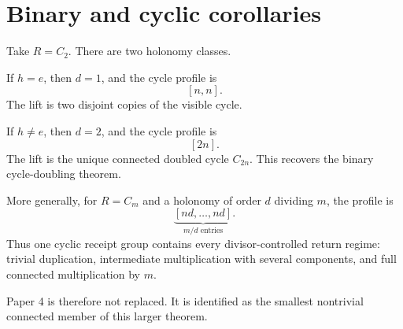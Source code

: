 \section{Binary and cyclic corollaries}

Take $R=C_2$. There are two holonomy classes.

If $h=e$, then $d=1$, and the cycle profile is
\[
[n,n].
\]
The lift is two disjoint copies of the visible cycle.

If $h\neq e$, then $d=2$, and the cycle profile is
\[
[2n].
\]
The lift is the unique connected doubled cycle $C_{2n}$. This recovers the
binary cycle-doubling theorem.

More generally, for $R=C_m$ and a holonomy of order $d$ dividing $m$, the
profile is
\[
\underbrace{[nd,\ldots,nd]}_{m/d\text{ entries}}.
\]
Thus one cyclic receipt group contains every divisor-controlled return regime:
trivial duplication, intermediate multiplication with several components,
and full connected multiplication by $m$.

Paper 4 is therefore not replaced. It is identified as the smallest
nontrivial connected member of this larger theorem.

